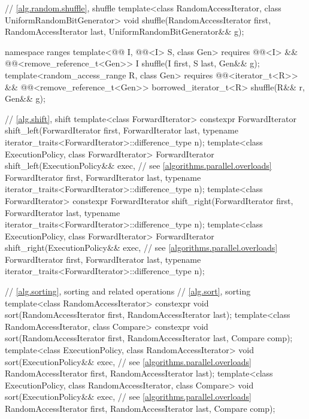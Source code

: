 \begin{codeblock}
{  // \ref{alg.random.shuffle}, shuffle
  template<class RandomAccessIterator, class UniformRandomBitGenerator>
    void shuffle(RandomAccessIterator first,
                 RandomAccessIterator last,
                 UniformRandomBitGenerator&& g);

  namespace ranges {
    template<@@ I, @@<I> S, class Gen>
      requires @@<I> &&
               @@<remove_reference_t<Gen>>
      I shuffle(I first, S last, Gen&& g);
    template<random_access_range R, class Gen>
      requires @@<iterator_t<R>> &&
               @@<remove_reference_t<Gen>>
      borrowed_iterator_t<R> shuffle(R&& r, Gen&& g);
  }

  // \ref{alg.shift}, shift
  template<class ForwardIterator>
    constexpr ForwardIterator
      shift_left(ForwardIterator first, ForwardIterator last,
                 typename iterator_traits<ForwardIterator>::difference_type n);
  template<class ExecutionPolicy, class ForwardIterator>
    ForwardIterator
      shift_left(ExecutionPolicy&& exec,                        // see \ref{algorithms.parallel.overloads}
                 ForwardIterator first, ForwardIterator last,
                 typename iterator_traits<ForwardIterator>::difference_type n);
  template<class ForwardIterator>
    constexpr ForwardIterator
      shift_right(ForwardIterator first, ForwardIterator last,
                  typename iterator_traits<ForwardIterator>::difference_type n);
  template<class ExecutionPolicy, class ForwardIterator>
    ForwardIterator
      shift_right(ExecutionPolicy&& exec,                       // see \ref{algorithms.parallel.overloads}
                  ForwardIterator first, ForwardIterator last,
                  typename iterator_traits<ForwardIterator>::difference_type n);

  // \ref{alg.sorting}, sorting and related operations
  // \ref{alg.sort}, sorting
  template<class RandomAccessIterator>
    constexpr void sort(RandomAccessIterator first, RandomAccessIterator last);
  template<class RandomAccessIterator, class Compare>
    constexpr void sort(RandomAccessIterator first, RandomAccessIterator last,
                        Compare comp);
  template<class ExecutionPolicy, class RandomAccessIterator>
    void sort(ExecutionPolicy&& exec,                           // see \ref{algorithms.parallel.overloads}
              RandomAccessIterator first, RandomAccessIterator last);
  template<class ExecutionPolicy, class RandomAccessIterator, class Compare>
    void sort(ExecutionPolicy&& exec,                           // see \ref{algorithms.parallel.overloads}
              RandomAccessIterator first, RandomAccessIterator last,
              Compare comp);

}
\end{codeblock}
